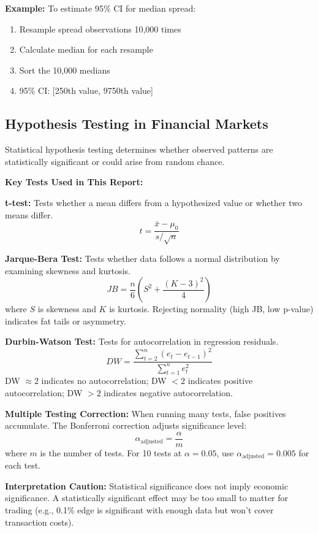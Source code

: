 \textbf{Example:} To estimate 95\% CI for median spread:
\begin{enumerate}
    \item Resample spread observations 10,000 times
    \item Calculate median for each resample
    \item Sort the 10,000 medians
    \item 95\% CI: [250th value, 9750th value]
\end{enumerate}

\subsection{Hypothesis Testing in Financial Markets}
\label{method:hypothesis-appendix}

Statistical hypothesis testing determines whether observed patterns are statistically significant or could arise from random chance.

\textbf{Key Tests Used in This Report:}

\textbf{t-test:} Tests whether a mean differs from a hypothesized value or whether two means differ.
\begin{equation}
t = \frac{\bar{x} - \mu_0}{s / \sqrt{n}}
\end{equation}

\textbf{Jarque-Bera Test:} Tests whether data follows a normal distribution by examining skewness and kurtosis.
\begin{equation}
JB = \frac{n}{6}\left(S^2 + \frac{(K-3)^2}{4}\right)
\end{equation}
where $S$ is skewness and $K$ is kurtosis. Rejecting normality (high JB, low p-value) indicates fat tails or asymmetry.

\textbf{Durbin-Watson Test:} Tests for autocorrelation in regression residuals.
\begin{equation}
DW = \frac{\sum_{t=2}^{n}(e_t - e_{t-1})^2}{\sum_{t=1}^{n}e_t^2}
\end{equation}
DW $\approx 2$ indicates no autocorrelation; DW $< 2$ indicates positive autocorrelation; DW $> 2$ indicates negative autocorrelation.

\textbf{Multiple Testing Correction:} When running many tests, false positives accumulate. The Bonferroni correction adjusts significance level:
\begin{equation}
\alpha_{\text{adjusted}} = \frac{\alpha}{m}
\end{equation}
where $m$ is the number of tests. For 10 tests at $\alpha = 0.05$, use $\alpha_{\text{adjusted}} = 0.005$ for each test.

\textbf{Interpretation Caution:} Statistical significance does not imply economic significance. A statistically significant effect may be too small to matter for trading (e.g., 0.1\% edge is significant with enough data but won't cover transaction costs).
